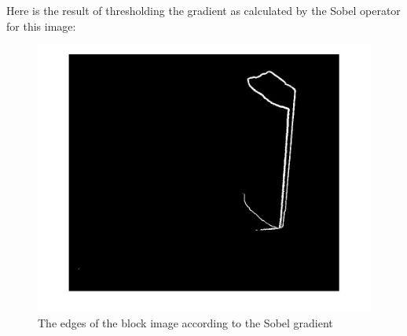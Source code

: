 \documentclass{article}
\begin{document}
Here is the result of thresholding the gradient as calculated by the Sobel operator for this image:
\begin{figure}[H]
  \centering
  \includegraphics[scale=0.36]{Images/block/sobel_block.jpg}
  \caption{The edges of the block image according to the Sobel gradient}
  \label{block_sobel}
\end{figure}
\end{document}
